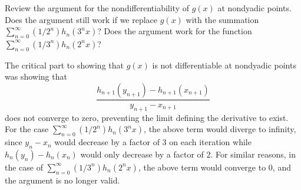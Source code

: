 \begin{exercise}
Review the argument for the nondifferentiability of $g(x)$ at nondyadic points. Does the argument still work if we replace $g(x)$ with the summation $\sum_{n=0}^{\infty}(1 / 2^{n}) h_n(3^{n} x)$? Does the argument work for the function $\sum_{n=0}^{\infty}(1 / 3^{n}) h_n(2^{n} x)$?
\end{exercise}

\begin{solution}
The critical part to showing that \(g(x)\) is not differentiable at nondyadic points was showing that
\[\frac{h_{n+1}(y_{n+1}) - h_{n+1}(x_{n+1})}{y_{n+1} - x_{n+1}}\]
does not converge to zero, preventing the limit defining the derivative to exist. For the case \(\sum_{n=0}^{\infty}(1 / 2^{n}) h_n(3^{n} x)\), the above term would diverge to infinity, since \(y_n-x_n\) would decrease by a factor of 3 on each iteration while \(h_n(y_n) - h_n(x_n)\) would only decrease by a factor of 2. For similar reasons, in the case of \(\sum_{n=0}^{\infty}(1 / 3^{n}) h_n(2^{n} x) \), the above term would converge to 0, and the argument is no longer valid.
\end{solution}
